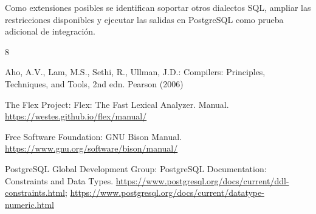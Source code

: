 \documentclass[runningheads]{llncs}
\begin{document}
Como extensiones posibles se identifican soportar otros dialectos SQL, ampliar
las restricciones disponibles y ejecutar las salidas en PostgreSQL como prueba
adicional de integración.

\begin{thebibliography}{8}

Aho, A.V., Lam, M.S., Sethi, R., Ullman, J.D.: Compilers: Principles,
Techniques, and Tools, 2nd edn. Pearson (2006)

The Flex Project: Flex: The Fast Lexical Analyzer. Manual.
\url{https://westes.github.io/flex/manual/}

Free Software Foundation: GNU Bison Manual.
\url{https://www.gnu.org/software/bison/manual/}

PostgreSQL Global Development Group: PostgreSQL Documentation: Constraints
and Data Types.
\url{https://www.postgresql.org/docs/current/ddl-constraints.html};
\url{https://www.postgresql.org/docs/current/datatype-numeric.html}

\end{thebibliography}
\end{document}
